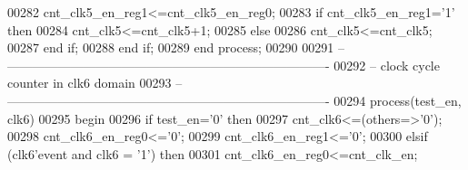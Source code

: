 \begin{DoxyCode}
00282             \textcolor{vhdlchar}{cnt_clk5_en_reg1}\textcolor{vhdlchar}{<=}\textcolor{vhdlchar}{cnt_clk5_en_reg0};
00283           \textcolor{keywordflow}{if} \textcolor{vhdlchar}{cnt_clk5_en_reg1}\textcolor{vhdlchar}{=}\textcolor{vhdlchar}{'}\textcolor{vhdllogic}{}\textcolor{vhdllogic}{1}\textcolor{vhdlchar}{'} \textcolor{keywordflow}{then} 
00284                 \textcolor{vhdlchar}{cnt_clk5}\textcolor{vhdlchar}{<=}\textcolor{vhdlchar}{cnt_clk5}\textcolor{vhdlchar}{+}\textcolor{vhdllogic}{}\textcolor{vhdllogic}{1};
00285             \textcolor{keywordflow}{else} 
00286                 \textcolor{vhdlchar}{cnt_clk5}\textcolor{vhdlchar}{<=}\textcolor{vhdlchar}{cnt_clk5};
00287             \textcolor{keywordflow}{end} \textcolor{keywordflow}{if};
00288         \textcolor{keywordflow}{end} \textcolor{keywordflow}{if};
00289     \textcolor{keywordflow}{end} \textcolor{keywordflow}{process};    
00290     
00291 \textcolor{keyword}{-- ----------------------------------------------------------------------------}
00292 \textcolor{keyword}{-- clock cycle counter in clk6 domain}
00293 \textcolor{keyword}{-- ----------------------------------------------------------------------------}
00294   \textcolor{keywordflow}{process}(test_en, clk6)
00295 \textcolor{vhdlkeyword}{    begin}
00296       \textcolor{keywordflow}{if} \textcolor{vhdlchar}{test_en}\textcolor{vhdlchar}{=}\textcolor{vhdlchar}{'}\textcolor{vhdllogic}{}\textcolor{vhdllogic}{0}\textcolor{vhdlchar}{'} \textcolor{keywordflow}{then}
00297             \textcolor{vhdlchar}{cnt_clk6}\textcolor{vhdlchar}{<=}\textcolor{vhdlchar}{(}\textcolor{keywordflow}{others}\textcolor{vhdlchar}{=}\textcolor{vhdlchar}{>}\textcolor{vhdlchar}{'}\textcolor{vhdllogic}{}\textcolor{vhdllogic}{0}\textcolor{vhdlchar}{'}\textcolor{vhdlchar}{)};
00298             \textcolor{vhdlchar}{cnt_clk6_en_reg0}\textcolor{vhdlchar}{<=}\textcolor{vhdlchar}{'}\textcolor{vhdllogic}{}\textcolor{vhdllogic}{0}\textcolor{vhdlchar}{'};
00299             \textcolor{vhdlchar}{cnt_clk6_en_reg1}\textcolor{vhdlchar}{<=}\textcolor{vhdlchar}{'}\textcolor{vhdllogic}{}\textcolor{vhdllogic}{0}\textcolor{vhdlchar}{'}; 
00300         \textcolor{keywordflow}{elsif} \textcolor{vhdlchar}{(}\textcolor{vhdlchar}{clk6}\textcolor{vhdlchar}{'}\textcolor{vhdlkeyword}{event} \textcolor{keywordflow}{and} \textcolor{vhdlchar}{clk6} \textcolor{vhdlchar}{=} \textcolor{vhdlchar}{'}\textcolor{vhdllogic}{}\textcolor{vhdllogic}{1}\textcolor{vhdlchar}{'}\textcolor{vhdlchar}{)} \textcolor{keywordflow}{then}
00301             \textcolor{vhdlchar}{cnt_clk6_en_reg0}\textcolor{vhdlchar}{<=}\textcolor{vhdlchar}{cnt_clk_en};

\end{DoxyCode}
